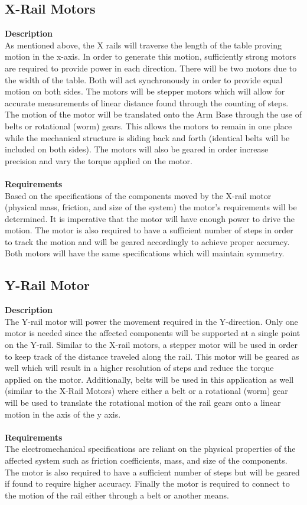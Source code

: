 \documentclass[titlepage]{article}
\begin{document}
\subsection{X-Rail Motors}
\textbf{Description}\\
As mentioned above, the X rails will traverse the length of the table proving motion in the x-axis. In order to generate this motion, sufficiently strong motors are required to provide power in each direction. There will be two motors due to the width of the table. Both will act synchronously in order to provide equal motion on both sides. The motors will be stepper motors which will allow for accurate measurements of linear distance found through the counting of steps. The motion of the motor will be translated onto the Arm Base through the use of belts or rotational (worm) gears. This allows the motors to remain in one place while the mechanical structure is sliding back and forth (identical belts will be included on both sides). The motors will also be geared in order increase precision and vary the torque applied on the motor.\\~\\
\textbf{Requirements}\\
Based on the specifications of the components moved by the X-rail motor (physical mass, friction, and size of the system) the motor's requirements will be determined. It is imperative that the motor will have enough power to drive the motion. The motor is also required to have a sufficient number of steps in order to track the motion and will be geared accordingly to achieve proper accuracy. Both motors will have the same specifications which will maintain symmetry. 

\subsection{Y-Rail Motor}
\textbf{Description}\\
The Y-rail motor will power the movement required in the Y-direction. Only one motor is needed since the affected components will be supported at a single point on the Y-rail. Similar to the X-rail motors, a stepper motor will be used in order to keep track of the distance traveled along the rail. This motor will be geared as well which will result in a higher resolution of steps and reduce the torque applied on the motor. Additionally, belts will be used in this application as well (similar to the X-Rail Motors) where either a belt or a rotational (worm) gear will be used to translate the rotational motion of the rail gears onto a linear motion in the axis of the y axis.\\~\\
\textbf{Requirements}\\
The electromechanical specifications are reliant on the physical properties of the affected system such as friction coefficients, mass, and size of the components. The motor is also required to have a sufficient number of steps but will be geared if found to require higher accuracy. Finally the motor is required to connect to the motion of the rail either through a belt or another means.
\end{document}
